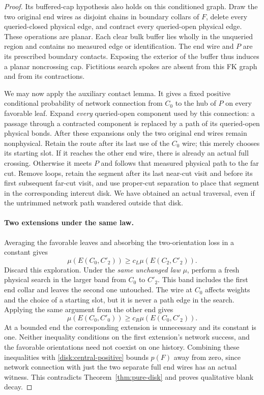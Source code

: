 \begin{proof}
Its buffered-cap hypothesis also holds on this conditioned graph.
Draw the two original end wires as disjoint chains in boundary collars
of $F$, delete every queried-closed physical edge, and contract every
queried-open physical edge.  These operations are planar.  Each clear
bulk buffer lies wholly in the unqueried region and contains no measured
edge or identification.  The end wire and $P$ are its prescribed
boundary contacts.  Exposing the exterior of the buffer thus induces
a planar noncrossing cap.  Fictitious search spokes are absent from
this FK graph and from its contractions.

We may now apply the auxiliary contact lemma.  It gives a fixed positive
conditional probability of network connection from $C_0$ to the hub
of $P$ on every favorable leaf.  Expand \emph{every} queried-open
component used by this connection: a passage through a contracted
component is replaced by a path of its queried-open physical bonds.
After these expansions only the two original end wires remain
nonphysical.  Retain the route after its last use of the $C_0$ wire;
this merely chooses its starting slot.  If it reaches the other end
wire, there is already an actual full crossing.  Otherwise it meets
$P$ and follows that measured physical path to the far cut.  Remove
loops, retain the segment after its last near-cut visit and before its
first subsequent far-cut visit, and use proper-cut separation to place
that segment in the corresponding intercut disk.  We have obtained an
actual traversal, even if the untrimmed network path wandered outside
that disk.

\paragraph{Two extensions under the same law.}
Averaging the favorable leaves and absorbing the two-orientation loss
in a constant gives
\begin{equation}\label{disk:left-extension}
 \mu(E(C_0,C'_2))\ge c_L\mu(E(C_2,C'_2)).
\end{equation}
Discard this exploration.  Under the \emph{same unchanged law} $\mu$,
perform a fresh physical search in the larger band from $C_0$ to
$C'_2$.  This band includes the first end collar and leaves the second
one untouched.  The wire at $C_0$ affects weights and the choice of a
starting slot, but it is never a path edge in the search.  Applying
the same argument from the other end gives
\begin{equation}\label{disk:right-extension}
 \mu(E(C_0,C'_0))\ge c_R\mu(E(C_0,C'_2)).
\end{equation}
At a bounded end the corresponding extension is unnecessary and its
constant is one.  Neither inequality conditions on the first
extension's network success, and the favorable orientations need not
coexist on one history.  Combining these inequalities with
\eqref{disk:central-positive} bounds $p(F)$ away from zero, since
network connection with just the two separate full end wires has an
actual witness.  This contradicts Theorem~\ref{thm:pure-disk} and proves
qualitative blank decay.


\end{proof}
